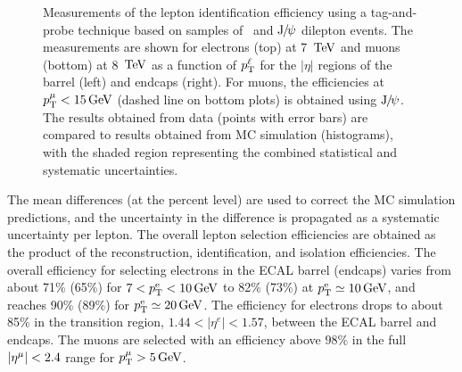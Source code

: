 \documentclass[12pt,twoside,a4paper,cmspaper,final,collab]{cms-tdr}
\begin{document}
\begin{figure}[htbp]
\begin{center}
     \caption{
     Measurements of the lepton identification efficiency using a tag-and-probe
     technique based on samples of \cPZ\  and $\mathrm{J}\hspace{-.08em}/\hspace{-.14em}\psi$ dilepton events. The measurements
     are shown for electrons (top) at 7 $\,\text{Te\hspace{-.08em}V}$ and muons (bottom) at 8 $\,\text{Te\hspace{-.08em}V}$ as a function of $p_{\mathrm{T}}^{\ell} $ for
     the $ |\eta| $ regions of the barrel (left) and endcaps (right).
     For muons, the efficiencies at $p_{\mathrm{T}}^{\mu} < 15\,\text{Ge\hspace{-.08em}V}$ (dashed line on bottom plots)
     is obtained using $\mathrm{J}\hspace{-.08em}/\hspace{-.14em}\psi$.
     The results obtained from data (points with error bars) are compared to results
     obtained from MC simulation (histograms), with the shaded region representing
     the combined statistical and systematic uncertainties.
           }
    \label{fig:leptonTP}
   \end{center}
\end{figure}
The  mean differences (at the percent level) are used to correct the MC simulation predictions, and the uncertainty in the difference is
propagated as a systematic uncertainty per lepton.
The overall lepton selection efficiencies are obtained as the product of the reconstruction, identification,
and isolation efficiencies.
The overall efficiency for selecting electrons in the ECAL barrel (endcaps) varies from
about  71\% (65\%) for $7 < p_{\mathrm{T}}^{\mathrm{e}} < 10\,\text{Ge\hspace{-.08em}V}$ to  82\% (73\%) at $p_{\mathrm{T}}^{\mathrm{e}} \simeq 10\,\text{Ge\hspace{-.08em}V}$,
and reaches 90\% (89\%) for $p_{\mathrm{T}}^{\mathrm{e}} \simeq 20\,\text{Ge\hspace{-.08em}V}$.
The efficiency for electrons drops to about 85\% in the transition region, $1.44 < |\eta^e| < 1.57$, between
the ECAL barrel and endcaps.
The muons are selected with an efficiency above $98\%$ in the full $|\eta^{{\mu}}| < 2.4$ range
for $p_{\mathrm{T}}^{\mu} > 5\,\text{Ge\hspace{-.08em}V}$.
\end{document}
